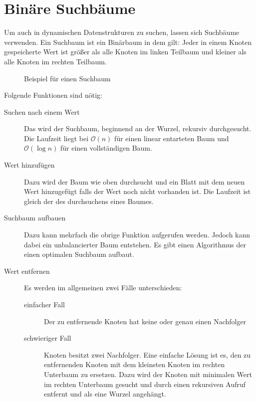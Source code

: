 \section{Binäre Suchbäume}
Um auch in dynamischen Datenstrukturen zu suchen, lassen sich Suchbäume verwenden.
Ein Suchbaum ist ein Binärbaum in dem gilt: Jeder in einem Knoten gespeicherte Wert ist größer als alle Knoten im linken Teilbaum und kleiner als alle Knoten im rechten Teilbaum.
\begin{figure}[htbp]
	\begin{center}
	\end{center}
	\label{img:SuchBaum}
	\caption{Beispiel für einen Suchbaum}
\end{figure}
Folgende Funktionen sind nötig:
\begin{description}
	\item[Suchen nach einem Wert] Das wird der Suchbaum, beginnend an der Wurzel, rekursiv durchgesucht.
		Die Laufzeit liegt bei \(\mathcal{O}(n)\) für einen linear entarteten Baum und \(\mathcal{O}(\log n)\) für einen vollständigen Baum.
	\item[Wert hinzufügen] Dazu wird der Baum wie oben durchsucht und ein Blatt mit dem neuen Wert hinzugefügt falls der Wert noch nicht vorhanden ist.
		Die Laufzeit ist gleich der des durchsuchens eines Baumes.
	\item[Suchbaum aufbauen] Dazu kann mehrfach die obrige Funktion aufgerufen werden.
		Jedoch kann dabei ein unbalancierter Baum entstehen.
		Es gibt einen Algorithmus der einen optimalen Suchbaum aufbaut.
	\item[Wert entfernen] Es werden im allgemeinen zwei Fälle unterschieden:
		\begin{description}
			\item[einfacher Fall] Der zu entfernende Knoten hat keine oder genau einen Nachfolger
			\item[schwieriger Fall] Knoten besitzt zwei Nachfolger.
				Eine einfache Lösung ist es, den zu entfernenden Knoten mit dem kleinsten Knoten im rechten Unterbaum zu ersetzen.
				Dazu wird der Knoten mit minimalen Wert im rechten Unterbaum gesucht und durch einen rekursiven Aufruf entfernt und als eine Wurzel angehängt.
		\end{description}
\end{description}


